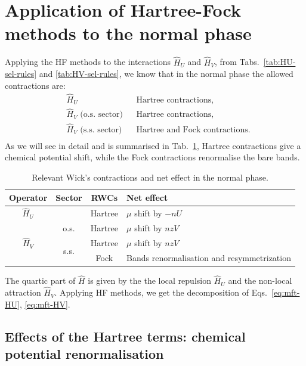 \begin{tabproof}
	\todo
\end{tabproof}

\section{Application of Hartree-Fock methods to the normal phase}\label{sec:normal-hf}

Applying the HF methods to the interactions $\hat H_U$ and $\hat H_V$, from Tabs.~\ref{tab:HU-sel-rules} and \ref{tab:HV-sel-rules}, we know that in the normal phase the allowed contractions are:
\[
\begin{aligned}
	&\hat H_U 
	&&\text{Hartree contractions,} \\
	&\hat H_V \text{ (o.s. sector)}
	&&\text{Hartree contractions,} \\
	&\hat H_V \text{ (s.s. sector)}
	&&\text{Hartree and Fock contractions.} \\
\end{aligned}	
\]
As we will see in detail and is summarised in Tab.~\ref{tab:normal-RWCs}, Hartree contractions give a chemical potential shift, while the Fock contractions renormalise the bare bands.

\begin{table}[t]
	\centering
	\begin{tabular}{c c c l}
		\textbf{Operator} & \textbf{Sector} & \textbf{RWCs} & \textbf{Net effect} \\
		\midrule
		$\hat H_U$ && Hartree & $\mu$ shift by $-nU$ \\
		\midrule
		\multirow{3}{*}{$\hat H_V$} & o.s. & Hartree & $\mu$ shift by $nzV$ \\[0.5em]
		 & \multirow{2}{*}{s.s.} & Hartree & $\mu$ shift by $nzV$\\
		&& Fock & Bands renormalisation and resymmetrization \\
		\midrule
	\end{tabular}
	\caption{Relevant Wick's contractions and net effect in the normal phase.}
	\label{tab:normal-RWCs}
\end{table}

The quartic part of $\hat H$ is given by the the local repulsion $\hat H_U$ and the non-local attraction $\hat H_V$. Applying HF methods, we get the decomposition of Eqs.~\eqref{eq:mft-HU}, \eqref{eq:mft-HV}.

\subsection{Effects of the Hartree terms: chemical potential renormalisation}\label{subsec:normal-hartree-mu}


